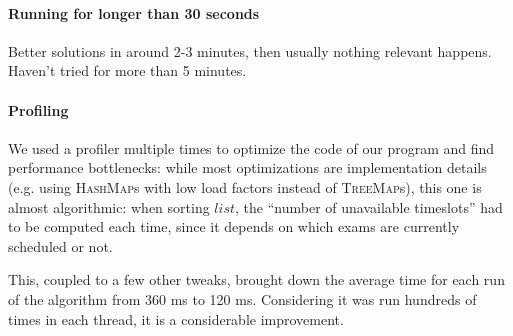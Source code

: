 \documentclass[11pt, a4paper, leqno]{article}
\begin{document}
	\paragraph{Running for longer than 30 seconds}
	
	Better solutions in around 2-3 minutes, then usually nothing relevant happens. Haven't tried for more than 5 minutes.
	
	\paragraph{Profiling}
	
	We used a profiler multiple times to optimize the code of our program and find performance bottlenecks: while most optimizations are implementation details (e.g. using \textsc{HashMap}s with low load factors instead of \textsc{TreeMap}s), this one is almost algorithmic: when sorting $list$, the ``number of unavailable timeslots'' had to be computed each time, since it depends on which exams are currently scheduled or not.
	
	This, coupled to a few other tweaks, brought down the average time for each run of the algorithm from 360 ms to 120 ms. Considering it was run hundreds of times in each thread, it is a considerable improvement.
	
\end{document}
